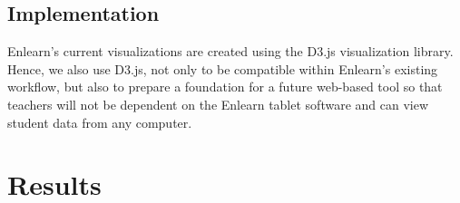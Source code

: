 \documentclass{sigchi}
\begin{document}
\subsection{Implementation}
Enlearn's current visualizations are created using the D3.js visualization library. Hence, we also use D3.js, not only to be compatible within Enlearn's existing workflow, but also to prepare a foundation for a future web-based tool so that teachers will not be dependent on the Enlearn tablet software and can view student data from any computer.

\section{Results}
\end{document}
